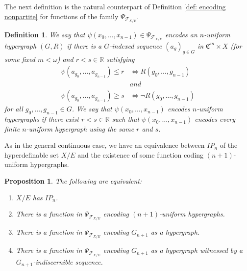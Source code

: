 \documentclass{amsart}
\newtheorem{prop}[teor]{Proposition}
\newtheorem{defin}[teor]{Definition}
\newtheorem{external claim}[teor]{Claim}
\newcommand{\C}{{\mathfrak C}}
\begin{document}
 The next definition is the natural counterpart of Definition \ref{def: encoding nonpartite} for functions of the family $\Psi_{ \mathcal{F}_{X/E} }$.


\begin{defin}
    We say that $\psi(x_0,\dots,x_{n-1})\in \Psi_{ \mathcal{F}_{X/E} } $ \emph{encodes an $n$-uniform hypergraph $(G,R)$} if there is a $G$-indexed sequence $(a_g)_{g\in G}$ in $\C^m\times X$ (for some fixed $m<\omega$)  and $r<s\in\mathbb{R}$ satisfying 
    \begin{align*}
        \psi( a_{g_0},\dots, a_{g_{n-1}}  )\leq r &\iff  R(g_0,\dots, g_{n-1})\\
        &and\\
        \psi(a_{g_0},\dots, a_{g_{n-1}}  )\geq s &\iff \neg R(g_0,\dots, g_{n-1})
    \end{align*}
    for all 
    $g_0,\dots,g_{n-1}\in G$.
    We say that $\psi(x_0,\dots,x_{n-1})$ \emph{encodes $n$-uniform hypergraphs} if there exist $r<s\in\mathbb{R}$ such that $\psi(x_0,\dots,x_{n-1})$ encodes every finite $n$-uniform hypergraph using the same $r$ and $s$.
\end{defin}

As in the general continuous case, we have an equivalence between $IP_n$ of the hyperdefinable set $X/E$ and the existence of some function coding $(n+1)$-uniform hypergraphs.

\begin{prop}\label{Hyperim: IP_n iff coding nonpartite} %
The following are equivalent:
\begin{enumerate}
    \item $X/E$ has $IP_n$.
    \item There is a function in $\Psi_{\mathcal{F}_{X/E}}$ encoding $(n+1)$-uniform hypergraphs.
    \item There is a function in $\Psi_{\mathcal{F}_{X/E}}$ encoding $G_{n+1}$ as a hypergraph.
    \item There is a function in $\Psi_{\mathcal{F}_{X/E}}$ encoding $G_{n+1}$ as a hypergraph witnessed by a $G_{n+1}$-indiscernible sequence.
\end{enumerate}
\end{prop}
\end{document}

